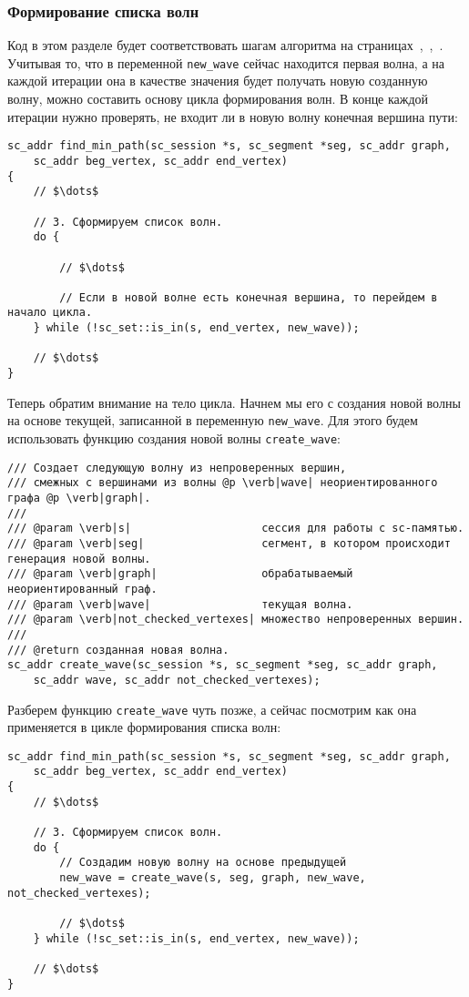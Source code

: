 \subsubsection{Формирование списка волн}
\label{sec:libscprg_fmp_waves_list}

Код в этом разделе будет соответствовать шагам алгоритма на
страницах~\pageref{astep:S4_Create_next_wave},~\pageref{astep:S5_Create_next_wave},~\pageref{astep:S6_Create_last_wave}.
Учитывая то, что в переменной \lstinline|new_wave| сейчас находится
первая волна, а на каждой итерации она в качестве значения будет
получать новую созданную волну, можно составить основу цикла
формирования волн. В конце каждой итерации нужно проверять, не входит
ли в новую волну конечная вершина пути:
\begin{lstlisting}[texcl]
sc_addr find_min_path(sc_session *s, sc_segment *seg, sc_addr graph,
    sc_addr beg_vertex, sc_addr end_vertex)
{
    // $\dots$

    // 3. Сформируем список волн.
    do {

        // $\dots$

        // Если в новой волне есть конечная вершина, то перейдем в начало цикла.
    } while (!sc_set::is_in(s, end_vertex, new_wave));

    // $\dots$
}
\end{lstlisting}

Теперь обратим внимание на тело цикла. Начнем мы его с создания новой
волны на основе текущей, записанной в переменную
\lstinline|new_wave|. Для этого будем использовать функцию создания
новой волны \lstinline|create_wave|:
\begin{lstlisting}[texcl]
/// Создает следующую волну из непроверенных вершин,
/// смежных с вершинами из волны @p \verb|wave| неориентированного графа @p \verb|graph|.
///
/// @param \verb|s|                    сессия для работы с sc-памятью.
/// @param \verb|seg|                  сегмент, в котором происходит генерация новой волны.
/// @param \verb|graph|                обрабатываемый неориентированный граф.
/// @param \verb|wave|                 текущая волна.
/// @param \verb|not_checked_vertexes| множество непроверенных вершин.
///
/// @return созданная новая волна.
sc_addr create_wave(sc_session *s, sc_segment *seg, sc_addr graph,
    sc_addr wave, sc_addr not_checked_vertexes);
\end{lstlisting}

Разберем функцию \lstinline|create_wave| чуть позже, а сейчас
посмотрим как она применяется в цикле формирования списка волн:
\begin{lstlisting}[texcl]
sc_addr find_min_path(sc_session *s, sc_segment *seg, sc_addr graph,
    sc_addr beg_vertex, sc_addr end_vertex)
{
    // $\dots$

    // 3. Сформируем список волн.
    do {
        // Создадим новую волну на основе предыдущей
        new_wave = create_wave(s, seg, graph, new_wave, not_checked_vertexes);

        // $\dots$
    } while (!sc_set::is_in(s, end_vertex, new_wave));

    // $\dots$
}
\end{lstlisting}

